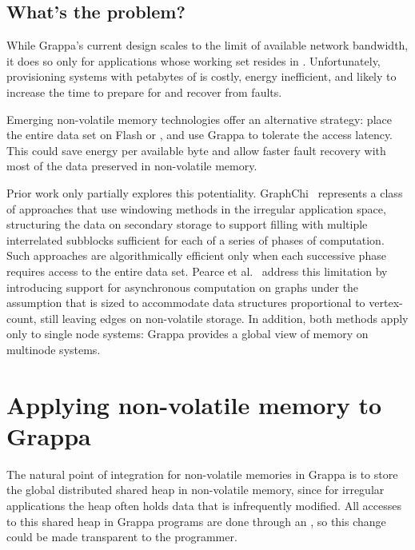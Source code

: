 \subsection{What's the problem?}

While Grappa's current design scales to the limit of available network
bandwidth, it does so only for applications whose working set resides
in \@.  Unfortunately, provisioning systems with petabytes of  is
costly, energy inefficient, and likely to increase the time to prepare
for and recover from faults.

Emerging non-volatile memory technologies offer an alternative strategy:
place the entire data set on Flash or , and
use Grappa to tolerate the access latency. This could save energy per available byte and allow
faster fault recovery with most of the data preserved in non-volatile memory.

Prior work only partially explores this potentiality. GraphChi~\cite{graphchi:osdi12}
represents a class of approaches that use windowing methods in the
irregular application space, structuring the data on secondary storage
to support filling  with multiple interrelated subblocks sufficient
for each of a series of phases of computation.  Such approaches are
algorithmically efficient only when each successive phase requires
access to the entire data set.  Pearce et al.~\cite{magt:2010} address this limitation by
introducing support for asynchronous computation on graphs under the
assumption that  is sized to accommodate data structures
proportional to vertex-count, still leaving edges on non-volatile
storage.  In addition, both methods apply only to single node systems:
Grappa provides a global view of memory on multinode systems.

\section{Applying non-volatile memory to Grappa}
The natural point of integration for non-volatile memories in Grappa
is to store the global distributed shared heap in non-volatile memory, since for irregular applications the heap
often holds data that is infrequently modified. All accesses to
this shared heap in Grappa programs are done through an , so this change could be made transparent to the programmer. 


